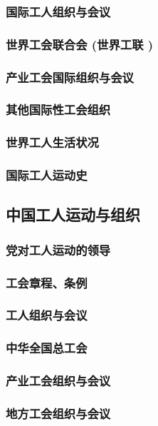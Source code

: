 \documentclass[UTF8]{../RepresentationUniverse}
\begin{document}
    \subsubsection{国际工人组织与会议}
    \subsubsection{世界工会联合会 (世界工联 )}
    \subsubsection{产业工会国际组织与会议}
    \subsubsection{其他国际性工会组织}
    \subsubsection{世界工人生活状况}
    \subsubsection{国际工人运动史}

\subsection{中国工人运动与组织}
    \subsubsection{党对工人运动的领导}
    \subsubsection{工会章程、条例}
    \subsubsection{工人组织与会议}
    \subsubsection{中华全国总工会}
    \subsubsection{产业工会组织与会议}
    \subsubsection{地方工会组织与会议}
\end{document}
